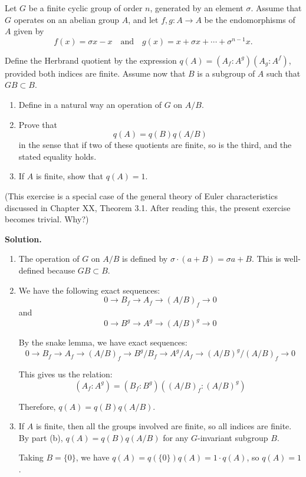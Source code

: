 \begin{problembox}
Let $G$ be a finite cyclic group of order $n$, generated by an element $\sigma$. Assume that $G$ operates on an abelian group $A$, and let $f, g : A \to A$ be the endomorphisms of $A$ given by
\[f(x) = \sigma x - x \quad \text{and} \quad g(x) = x + \sigma x + \cdots + \sigma^{n-1}x.\]

Define the Herbrand quotient by the expression $q(A) = (A_f : A^g)(A_g : A^f)$, provided both indices are finite. Assume now that $B$ is a subgroup of $A$ such that $GB \subset B$.
\begin{enumerate}[label=(\alph*)]
\item Define in a natural way an operation of $G$ on $A/B$.
\item Prove that
\[q(A) = q(B)q(A/B)\]
in the sense that if two of these quotients are finite, so is the third, and the stated equality holds.
\item If $A$ is finite, show that $q(A) = 1$.
\end{enumerate}
(This exercise is a special case of the general theory of Euler characteristics discussed in Chapter XX, Theorem 3.1. After reading this, the present exercise becomes trivial. Why?)
\end{problembox}

\noindent\textbf{Solution.}
\begin{enumerate}[label=(\alph*)]
\item The operation of $G$ on $A/B$ is defined by $\sigma \cdot (a + B) = \sigma a + B$. This is well-defined because $GB \subset B$.

\item We have the following exact sequences:
\[0 \to B_f \to A_f \to (A/B)_f \to 0\]
and
\[0 \to B^g \to A^g \to (A/B)^g \to 0\]

By the snake lemma, we have exact sequences:
\[0 \to B_f \to A_f \to (A/B)_f \to B^g/B_f \to A^g/A_f \to (A/B)^g/(A/B)_f \to 0\]

This gives us the relation:
\[(A_f : A^g) = (B_f : B^g)((A/B)_f : (A/B)^g)\]

Therefore, $q(A) = q(B)q(A/B)$.

\item If $A$ is finite, then all the groups involved are finite, so all indices are finite. By part (b), $q(A) = q(B)q(A/B)$ for any $G$-invariant subgroup $B$.

Taking $B = \{0\}$, we have $q(A) = q(\{0\})q(A) = 1 \cdot q(A)$, so $q(A) = 1$.
\end{enumerate}


